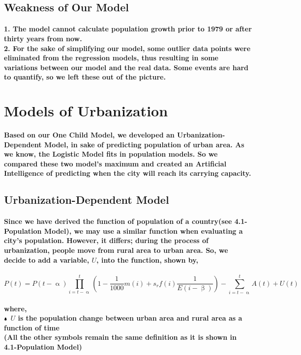 \documentclass{article}
\begin{document}
\subsection{Weakness of Our Model}
\paragraph{1. The model cannot calculate population growth prior to 1979 or after thirty years from now. \\
2. For the sake of simplifying our model, some outlier data points were eliminated from the regression models, thus resulting in some variations between our model and the real data. Some events are hard to quantify, so we left these out of the picture. }

\section{Models of Urbanization}
\paragraph{Based on our One Child Model, we developed an Urbanization-Dependent Model, in sake of predicting population of urban area. As we know, the Logistic Model fits in population models. So we compared these two model's maximum and created an Artificial Intelligence of predicting when the city will reach its carrying capacity.}

\subsection{Urbanization-Dependent Model}
\paragraph{Since we have derived the function of population of a country(see 4.1-Population Model), we may use a similar function when evaluating a city's population. However, it differs; during the process of urbanization, people move from rural area to urban area. So, we decide to add a variable, $U$, into the function, shown by, }
\paragraph{$$P(t)=P(t-\upalpha)\prod_{i=t-\upalpha}^t \left(1-\frac{1}{1000}m(i)+s_rf(i)\frac{1}{E(i-\upbeta)}\right)-\sum_{i=t-\upalpha}^t A(t)+U(t)$$}
\paragraph{where, \\
$\bell$ $U$ is the population change between urban area and rural area as a function of time \\
(All the other symbols remain the same definition as it is shown in 4.1-Population Model) }
\end{document}
